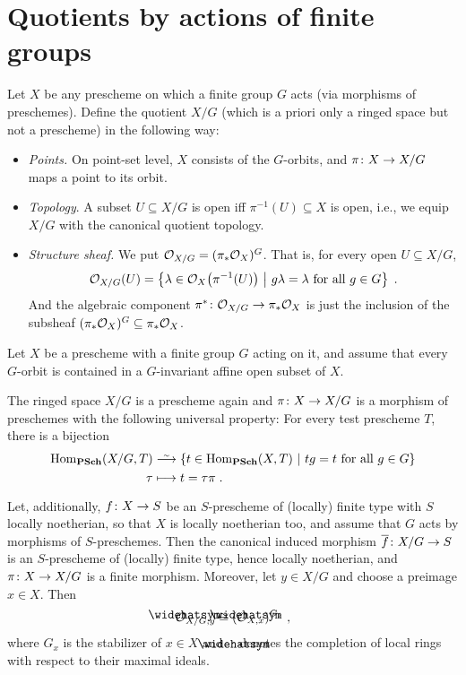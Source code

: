 \documentclass[a4paper,parskip=half,numbers=enddot, DIV=12]{scrreprt}
\begin{document}
\section{Quotients by actions of finite groups}
Let $X$ be any prescheme on which a finite group $G$ acts (via morphisms of preschemes). Define the quotient $X/G$ (which is a priori only a ringed space but not a prescheme) in the following way: 
\begin{itemize}
	\item \emph{Points.} On point-set level, $X$ consists of the $G$-orbits, and $\pi\colon X\morphism X/G$ maps a point to its orbit.
	\item \emph{Topology}. A subset $U\subseteq X/G$ is open iff $\pi^{-1}(U)\subseteq X$ is open, i.e., we equip $X/G$ with the canonical quotient topology.
	\item \emph{Structure sheaf.} We put $\mathcal{O}_{X/G}=(\pi_*\mathcal{O}_X)^G$. That is, for every open $U\subseteq X/G$,
	\begin{align*}
		\mathcal{O}_{X/G}(U)=\left\{\lambda\in\mathcal{O}_X\big(\pi^{-1}(U)\big)\ \middle|\  g\lambda=\lambda\text{ for all }g\in G\right\}\;.
	\end{align*}
	And the algebraic component $\pi^*\colon \Oo_{X/G}\morphism \pi_*\Oo_X$ is just the inclusion of the subsheaf $(\pi_*\mathcal{O}_X)^G\subseteq\pi_*\mathcal{O}_X$.
\end{itemize}
\begin{thm}
	Let $X$ be a prescheme with a finite group $G$ acting on it, and assume that every $G$-orbit is contained in a $G$-invariant affine open subset of $X$.
	\begin{alphanumerate}
		\item The ringed space $X/G$ is a prescheme again and $\pi\colon X\morphism X/G$ is a morphism of preschemes with the following universal property: For every test prescheme $T$, there is a bijection
		\begin{align*}
			\Hom_{\cat{PSch}}(X/G,T)&\isomorphism \left\{t\in\Hom_{\cat{PSch}}(X,T)\st tg=t\text{ for all }g\in G\right\}\\
			\tau&\longmapsto t=\tau\pi\;.
		\end{align*}
		\item Let, additionally, $f\colon X\morphism S$ be an $S$-prescheme of (locally) finite type with $S$ locally noetherian, so that $X$ is locally noetherian too, and assume that $G$ acts by morphisms of $S$-preschemes. Then the canonical induced morphism $\ov{f}\colon X/G\morphism S$ is an $S$-prescheme of (locally) finite type, hence locally noetherian, and $\pi\colon X\morphism X/G$ is a finite morphism. Moreover, let $y\in X/G$ and choose a preimage $x\in X$. Then
		\begin{align*}
			\roof{\Oo}_{X/G,y}\cong (\roof{\Oo}_{X,x})^{G_x}\;,
		\end{align*}
		where $G_x$ is the stabilizer of $x\in X$ and $\roof{\phantom{x}}$ denotes the completion of local rings with respect to their maximal ideals.
	\end{alphanumerate}
\end{thm}
\end{document}
